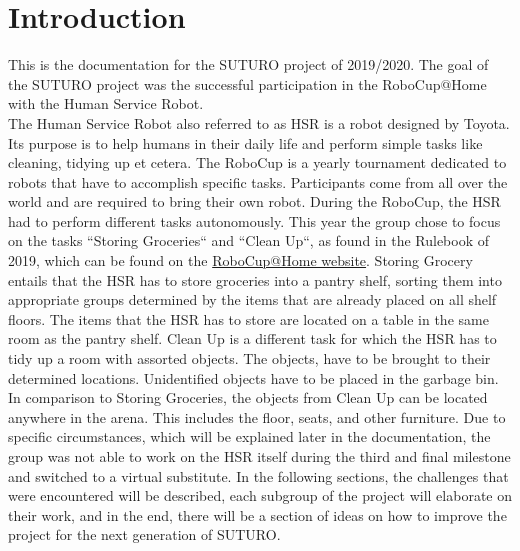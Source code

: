 \documentclass[main.tex]{subfiles}
\begin{document}
	\chapter{Introduction}
	\label{introduction}
	
	This is the documentation for the SUTURO project of 2019/2020. The goal of the SUTURO project was the successful participation in the RoboCup@Home with the Human Service Robot. \\
	The Human Service Robot also referred to as HSR is a robot designed by Toyota. Its purpose is to help humans in their daily life and perform simple tasks like cleaning, tidying up et cetera. The RoboCup is a yearly tournament dedicated to robots that have to accomplish specific tasks. Participants come from all over the world and are required to bring their own robot.
During the RoboCup, the HSR had to perform different tasks autonomously.
This year the group chose to focus on the tasks “Storing Groceries“ and “Clean Up“, as found in the Rulebook of 2019, which can be found on the \href{http://www.robocupathome.org/rules}{RoboCup@Home website}. 
	Storing Grocery entails that the HSR has to store groceries into a pantry shelf, sorting them into appropriate groups determined by the items that are already placed on all shelf floors. The items that the HSR has to store are located on a table in the same room as the pantry shelf.
Clean Up is a different task for which the HSR has to tidy up a room with assorted objects. The objects, have to be brought to their determined locations. Unidentified objects have to be placed in the garbage bin. In comparison to Storing Groceries, the objects from Clean Up can be located anywhere in the arena. This includes the floor, seats, and other furniture.
Due to specific circumstances, which will be explained later in the documentation, the group was not able to work on the HSR itself during the third and final milestone and switched to a virtual substitute.
	In the following sections, the challenges that were encountered will be described, each subgroup of the project will elaborate on their work, and in the end, there will be a section of ideas on how to improve the project for the next generation of SUTURO.
	
\end{document}
